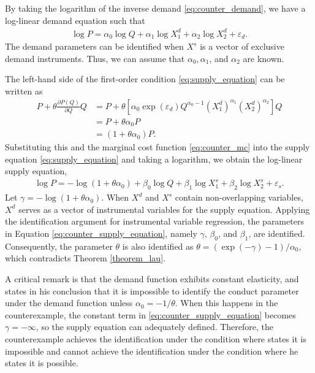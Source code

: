 \documentclass[11pt, a4paper]{article}
\theoremstyle{remark}
\begin{document}
By taking the logarithm of the inverse demand \eqref{eq:counter_demand}, we have a log-linear demand equation such that 
\begin{align}
    \log P = \alpha_0 \log Q + \alpha_1 \log X_{1}^{d}  + \alpha_2 \log X_{2}^{d} + \varepsilon_{d}.\label{eq:counter_demand_equation}
\end{align}
The demand parameters can be identified when $X^s$ is a vector of exclusive demand instruments.
Thus, we can assume that $\alpha_0, \alpha_1$, and $\alpha_2$ are known.  

The left-hand side of the first-order condition \eqref{eq:supply_equation} can be written as
\begin{align}
    P + \theta\frac{\partial P(Q)}{\partial Q}Q & =  P + \theta [\alpha_0 \exp(\varepsilon_{d})Q^{\alpha_0-1}(X_{1}^{d})^{\alpha_1}(X_{2}^{d})^{\alpha_2}] Q\\
    & = P + \theta \alpha_0 P\\
    &= (1 + \theta\alpha_0) P.
\end{align}
Substituting this and the marginal cost function \eqref{eq:counter_mc} into the supply equation \eqref{eq:supply_equation} and taking a logarithm, we obtain the log-linear supply equation,
\begin{align}
    \log P = - \log(1 + \theta\alpha_0) + \beta_0 \log Q + \beta_1 \log X_{1}^{s}+\beta_2 \log X_{2}^{s} + \varepsilon_{s}.\label{eq:counter_supply_equation}
\end{align}
Let $\gamma = - \log(1 + \theta\alpha_0)$. When $X^d$ and $X^s$ contain non-overlapping variables, $X^d$ serves as a vector of instrumental variables for the supply equation. 
Applying the identification argument for instrumental variable regression, the parameters in Equation \eqref{eq:counter_supply_equation}, namely $\gamma$, $\beta_0$, and $\beta_1$, are identified. 
Consequently, the parameter $\theta$ is also identified as $\theta = (\exp(-\gamma) - 1)/\alpha_0$, which contradicts Theorem \ref{theorem_lau}. 

A critical remark is that the demand function exhibits constant elasticity, and \citet{lau1982identifying} states in his conclusion that it is impossible to identify the conduct parameter under the demand function unless $\alpha_0 = -1/\theta$. 
When this happens in the counterexample, the constant term in \eqref{eq:counter_supply_equation} becomes $\gamma = -\infty$, so the supply equation can adequately defined.
Therefore, the counterexample achieves the identification under the condition where \citet{lau1982identifying} states it is impossible and cannot achieve the identification under the condition where he states it is possible.
\end{document}
